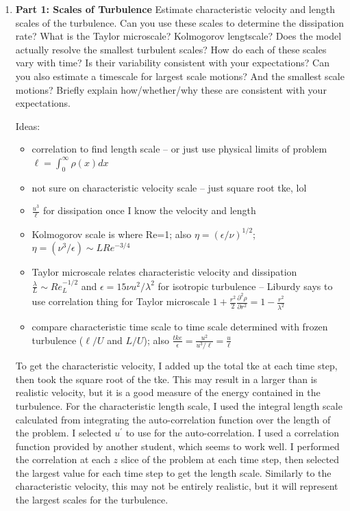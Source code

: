 \documentclass[11pt]{article}
\begin{document}
\begin{enumerate}

    \item \textbf{Part 1: Scales of Turbulence} Estimate characteristic velocity and length scales of the turbulence. Can you use these scales to determine the dissipation rate? What is the Taylor microscale? Kolmogorov lengtscale? Does the model actually resolve the smallest turbulent scales? How do each of these scales vary with time? Is their variability consistent with your expectations? Can you also estimate a timescale for largest scale motions? And the smallest scale motions? Briefly explain how/whether/why these are consistent with your expectations.\par
    
    Ideas:
    \begin{itemize}
        \item correlation to find length scale -- or just use physical limits of problem $\ell = \int_0^{\infty}\rho(x)dx$
        \item not sure on characteristic velocity scale -- just square root tke, lol
        \item $\frac{u^3}{\ell}$ for dissipation once I know the velocity and length
        \item Kolmogorov scale is where Re=1; also $\eta=\left( \epsilon/\nu \right)^{1/2}$; $\eta=\left(\nu^3/\epsilon\right)\sim L Re^{-3/4}$
        \item Taylor microscale relates characteristic velocity and dissipation $\frac{\lambda}{L} \sim Re_L^{-1/2}$ and $\epsilon = 15\nu u^2 / \lambda^2$ for isotropic turbulence -- Liburdy says to use correlation thing for Taylor microscale $1+\frac{r^2}{2}\frac{\partial^2\rho}{\partial r^2} = 1-\frac{r^2}{\lambda^2}$
        \item compare characteristic time scale to time scale determined with frozen turbulence ($\ell/U$ and $L/U$); also $\frac{tke}{\epsilon}=\frac{u^2}{u^3/\ell}=\frac{u}{\ell}$
    \end{itemize}
	To get the characteristic velocity, I added up the total tke at each time step, then took the square root of the tke. This may result in a larger than is realistic velocity, but it is a good measure of the energy contained in the turbulence. For the characteristic length scale, I used the integral length scale calculated from integrating the auto-correlation function over the length of the problem. I selected $u^{\prime}$ to use for the auto-correlation. I used a correlation function provided by another student, which seems to work well. I performed the correlation at each $z$ slice of the problem at each time step, then selected the largest value for each time step to get the length scale. Similarly to the characteristic velocity, this may not be entirely realistic, but it will represent the largest scales for the turbulence.

\end{enumerate}
\end{document}
